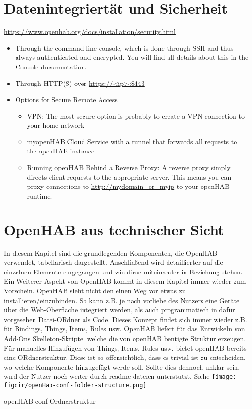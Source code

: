 \section{Datenintegriertät und Sicherheit}
\url{https://www.openhab.org/docs/installation/security.html}
\begin{itemize}
	\item Through the command line console, which is done through SSH and thus always authenticated and encrypted. You will find all details about this in the Console documentation.
	\item Through HTTP(S) over \url{https://<ip>:8443}
	\item Options for Secure Remote Access
	\begin{itemize}
		\item VPN: The most secure option is probably to create a VPN connection to your home network
		\item myopenHAB Cloud Service with a tunnel that forwards all requests to the openHAB instance
		\item Running openHAB Behind a Reverse Proxy: A reverse proxy simply directs client requests to the appropriate server. This means you can proxy connections to \url{http://mydomain_or_myip} to your openHAB runtime.
	\end{itemize}
\end{itemize}



\section{OpenHAB aus technischer Sicht}
In diesem Kapitel sind die grundlegenden Komponenten, die OpenHAB verwendet, tabellarisch dargestellt. Anschließend wird detaillierter auf die einzelnen Elemente eingegangen und wie diese miteinander in Beziehung stehen. Ein Weiterer Aspekt von OpenHAB kommt in diesem Kapitel immer wieder zum Vorschein. OpenHAB sieht nicht den einen Weg vor etwas zu installieren/einzubinden. So kann z.B. je nach vorliebe des Nutzers eine Geräte über die Web-Oberfläche integriert werden, als auch programmatisch in dafür vorgesehen Datei-ORdner als Code. Dieses Konzept findet sich immer wieder z.B. für Bindings, Things, Items, Rules usw. OpenHAB liefert für das Entwickeln von Add-Ons Skelleton-Skripte, welche die von openHAB bentigte Struktur erzeugen. Für manuelles Hinzufügen von Things, Items, Rules usw. bietet openHAB bereits eine ORdnerstruktur. Diese ist so offensichtlich, dass es trivial ist zu entscheiden, wo welche Komponente hinzugefügt werde soll. Sollte dies dennoch unklar sein, wird der Nutzer noch weiter durch readme-dateien unterstützt. Siehe 
\captionsetup{type=figure}
\texttt{[image: \\figdir/openHab-conf-folder-structure.png]}
\caption{openHAB-conf Ordnerstruktur \label{fig:openHab-conf-folder-structure}}

